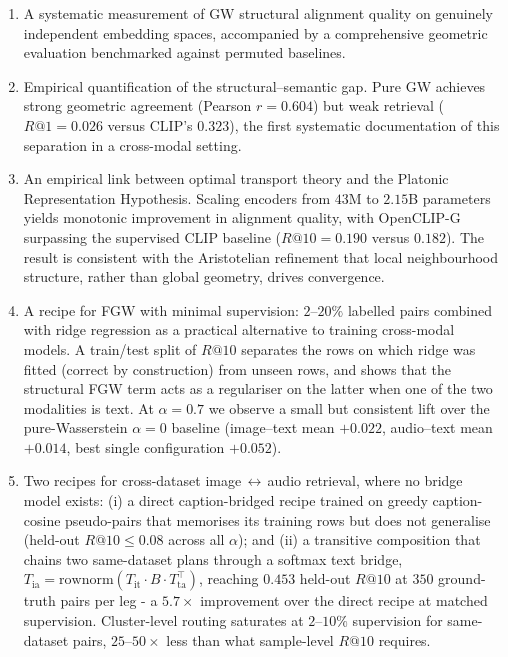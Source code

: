 \begin{enumerate}
  \item A systematic measurement of GW structural alignment quality on genuinely independent embedding spaces, accompanied by a comprehensive geometric evaluation benchmarked against permuted baselines.
  \item Empirical quantification of the structural--semantic gap. Pure GW achieves strong geometric agreement (Pearson $r = 0.604$) but weak retrieval ($R@1 = 0.026$ versus CLIP's $0.323$), the first systematic documentation of this separation in a cross-modal setting.
  \item An empirical link between optimal transport theory and the Platonic Representation Hypothesis. Scaling encoders from $43$M to $2.15$B parameters yields monotonic improvement in alignment quality, with OpenCLIP-G surpassing the supervised CLIP baseline ($R@10 = 0.190$ versus $0.182$). The result is consistent with the Aristotelian refinement \cite{groger2026aristotelian} that local neighbourhood structure, rather than global geometry, drives convergence.
  \item A recipe for FGW with minimal supervision: $2$--$20\%$ labelled pairs combined with ridge regression \cite{hoerl1970ridge} as a practical alternative to training cross-modal models. A train/test split of $R@10$ separates the rows on which ridge was fitted (correct by construction) from unseen rows, and shows that the structural FGW term acts as a regulariser on the latter when one of the two modalities is text. At $\alpha = 0.7$ we observe a small but consistent lift over the pure-Wasserstein $\alpha = 0$ baseline (image--text mean $+0.022$, audio--text mean $+0.014$, best single configuration $+0.052$).
  \item Two recipes for cross-dataset image$\,\leftrightarrow\,$audio retrieval, where no bridge model exists: (i) a direct caption-bridged recipe trained on greedy caption-cosine pseudo-pairs that memorises its training rows but does not generalise (held-out $R@10 \le 0.08$ across all $\alpha$); and (ii) a transitive composition that chains two same-dataset plans through a softmax text bridge, $T_{\text{ia}} = \mathrm{rownorm}(T_{\text{it}} \cdot B \cdot T_{\text{ta}}^\top)$, reaching $0.453$ held-out $R@10$ at $350$ ground-truth pairs per leg - a $5.7\times$ improvement over the direct recipe at matched supervision. Cluster-level routing saturates at $2$--$10\%$ supervision for same-dataset pairs, $25$--$50\times$ less than what sample-level $R@10$ requires.
\end{enumerate}
